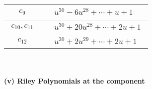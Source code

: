 \documentclass[1p]{elsarticle_modified}
\theoremstyle{definition}
\begin{document}
\begin{tabular}{m{50pt}|m{274pt}}
\hline $$\begin{aligned}c_{9}\end{aligned}$$&$\begin{aligned}
&u^{30}-6 u^{28}+\cdots+u+1
\end{aligned}$\\
\hline $$\begin{aligned}c_{10},c_{11}\end{aligned}$$&$\begin{aligned}
&u^{30}+20 u^{28}+\cdots+2 u+1
\end{aligned}$\\
\hline $$\begin{aligned}c_{12}\end{aligned}$$&$\begin{aligned}
&u^{30}+2 u^{29}+\cdots+2 u+1
\end{aligned}$\\
\hline
\end{tabular}\\~\\
\newpage\renewcommand{\arraystretch}{1}
\flushleft \textbf{(v) Riley Polynomials at the component}\newline \\
\end{document}
